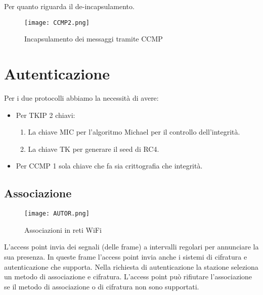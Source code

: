 \documentclass[14pt]{extreport}
\begin{document}
Per quanto riguarda il de-incapsulamento.




\begin{figure}[H]
    \centering
    \texttt{[image: CCMP2.png]}
    \caption{Incapsulamento dei messaggi tramite CCMP}
    \label{CCMP2}
\end{figure}




\section{Autenticazione}

Per i due protocolli abbiamo la necessità di avere:


\begin{itemize}
    \item Per TKIP 2 chiavi:
    
    \begin{enumerate}
        \item La chiave MIC per l'algoritmo Michael per il controllo dell'integrità.
        
        \item La chiave TK per generare il seed di RC4.
    \end{enumerate}
    
    \item Per CCMP 1 sola chiave che fa sia crittografia che integrità.
\end{itemize}



\subsection{Associazione}

\begin{figure}[H]
    \centering
    \texttt{[image: AUTOR.png]}
    \caption{Associazioni in reti WiFi}
    \label{AUTOR}
\end{figure}



L'access point invia dei segnali (delle frame) a intervalli regolari per annunciare la sua presenza. In queste frame l'access point invia anche i sistemi di cifratura e autenticazione che supporta. Nella richiesta di autenticazione la stazione seleziona un metodo di associazione e cifratura. L'access point può rifiutare l'associazione se il metodo di associazione o di cifratura non sono supportati.
\end{document}
